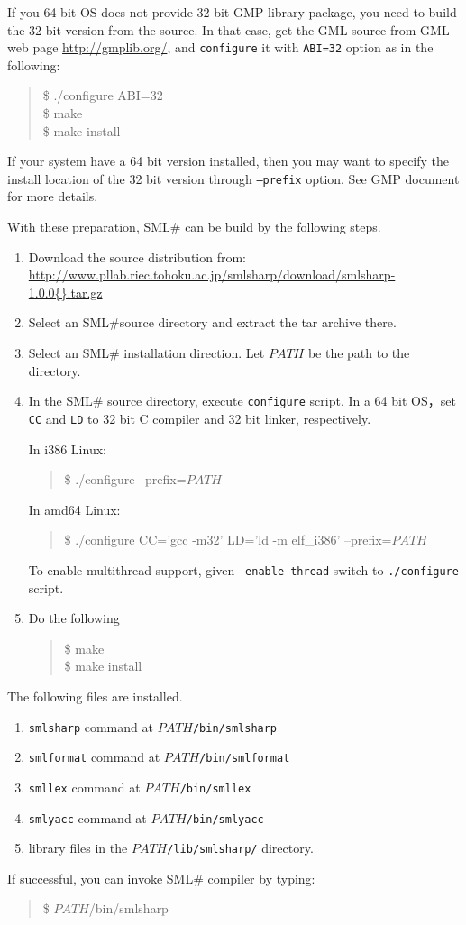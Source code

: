 \documentclass{jbook}
\newcommand{\smlsharp}{SML\#}
\newcommand{\version}{1.0.0}
\newenvironment{program}{\begin{tt}\begin{quote}}{\end{quote}\end{tt}}
\begin{document}
	If you 64 bit OS does not provide 32 bit GMP library package,
you need to build the 32 bit version from the source.
	In that case, get the GML source from GML web page 
\url{http://gmplib.org/},
and {\tt configure} it with {\tt ABI=32} option as in the following:
\begin{program}
\$ ./configure ABI=32\\
\$ make\\
\$ make install
\end{program}
	If your system have a 64 bit version installed, then you may
want to specify the install location of the 32 bit version through
{\tt --prefix} option.
	See GMP document for more details.


	With these preparation, \smlsharp{} can be build by the
following steps.
\begin{enumerate}
\item Download the source distribution from:
\url{http://www.pllab.riec.tohoku.ac.jp/smlsharp/download/smlsharp-\version{}.tar.gz}
\item Select an \smlsharp source directory and extract the tar archive there.
\item Select an \smlsharp{} installation direction. Let $PATH$ be the path
to the directory.
\item
	In the \smlsharp{} source directory, execute {\tt configure} script.
	In a 64 bit OS，set {\tt CC} and {\tt LD} to 32 bit C compiler
and 32 bit linker, respectively.

In i386 Linux:
\begin{program}
\$ ./configure --prefix=$PATH$
\end{program}
In amd64 Linux:
\begin{program}
\$ ./configure CC='gcc -m32' LD='ld -m elf\_i386' --prefix=$PATH$
\end{program}
	To enable multithread support, given 
{\tt --enable-thread} switch to {\tt ./configure} script.

\item
	Do the following
\begin{program}
\$ make\\
\$ make install
\end{program}
\end{enumerate}

	The following files are installed.
\begin{enumerate}
\item {\tt smlsharp} command at {\tt $PATH$/bin/smlsharp}
\item {\tt smlformat} command at {\tt $PATH$/bin/smlformat}
\item {\tt smllex} command at {\tt $PATH$/bin/smllex}
\item {\tt smlyacc} command at {\tt $PATH$/bin/smlyacc}
\item library files in the {\tt $PATH$/lib/smlsharp/} directory.
\end{enumerate}
	If successful, you can invoke \smlsharp{} compiler by typing:
\begin{program}
\$ $PATH$/bin/smlsharp
\end{program}
\end{document}
